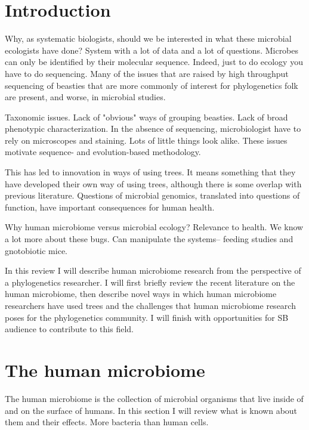 \documentclass{amsart}
\begin{document}
\section{Introduction}

Why, as systematic biologists, should we be interested in what these microbial ecologists have done?
System with a lot of data and a lot of questions.
Microbes can only be identified by their molecular sequence.
Indeed, just to do ecology you have to do sequencing.
Many of the issues that are raised by high throughput sequencing of beasties that are more commonly of interest for phylogenetics folk are present, and worse, in microbial studies.

Taxonomic issues.
Lack of "obvious" ways of grouping beasties.
Lack of broad phenotypic characterization.
In the absence of sequencing, microbiologist have to rely on microscopes and staining.
Lots of little things look alike.
These issues motivate sequence- and evolution-based methodology.

This has led to innovation in ways of using trees.
It means something that they have developed their own way of using trees, although there is some overlap with previous literature.
Questions of microbial genomics, translated into questions of function, have important consequences for human health.

Why human microbiome versus microbial ecology?
Relevance to health.
We know a lot more about these bugs.
Can manipulate the systems-- feeding studies and gnotobiotic mice.

In this review I will describe human microbiome research from the perspective of a phylogenetics researcher.
I will first briefly review the recent literature on the human microbiome, then describe novel ways in which human microbiome researchers have used trees and the challenges that human microbiome research poses for the phylogenetics community.
I will finish with opportunities for SB audience to contribute to this field.

\section{The human microbiome}
The human microbiome is the collection of microbial organisms that live inside of and on the surface of humans.
In this section I will review what is known about them and their effects.
More bacteria than human cells.
\end{document}
